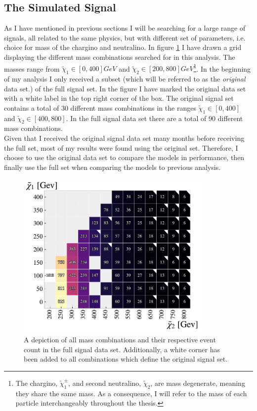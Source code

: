 \subsection{The Simulated Signal}\label{subsec:signal}
As I have mentioned in previous sections I will be searching for a large range of signals, all related to the same
physics, but with different set of parameters, i.e. choice for mass of the chargino and neutralino. In figure \ref{fig:nrSignal} I have drawn a 
grid displaying the different mass combinations searched for in this analysis. The masses range from ${\tilde{\chi}_1}\in[0,400]GeV$
and ${\tilde{\chi}_2}\in[200,800]GeV$\footnote{The chargino, $\tilde{\chi}^{\pm}_1$, and second neutralino, $\tilde{\chi}_2$, are mass degenerate, 
meaning they share the same mass. As a consequence, I will refer to the mass of each particle interchangeably throughout the thesis.}. In the beginning of my analysis I only received a subset (which will be referred to as the 
\emph{original} data set.) of the full signal set. In the figure I have marked the original data set with a white label in the top 
right corner of the box. The original signal set contains a total of 30 different mass combinations in the ranges 
${\tilde{\chi}_1}\in[0,400]$ and ${\tilde{\chi}_2}\in[400,800]$. In the full signal data set there are a total of 90 different 
mass combinations.
\\
Given that I received the original signal data set many months before receiving the full set, most of my results were found using the 
original set. Therefore, I choose to use the original data set to compare the models in performance, then finally use the full set 
when comparing the models to previous analysis.
\begin{figure}
  \centering
  \includegraphics[width=0.85\textwidth]{Figures/MLResults/NN/SUSY/Grid/NrSignalEvents.pdf}
  \caption{A depiction of all mass combinations and their respective event count in the full signal data set.
  Additionally, a white corner has been added to all combinations which define the original signal set.}
  \label{fig:nrSignal}
\end{figure}
